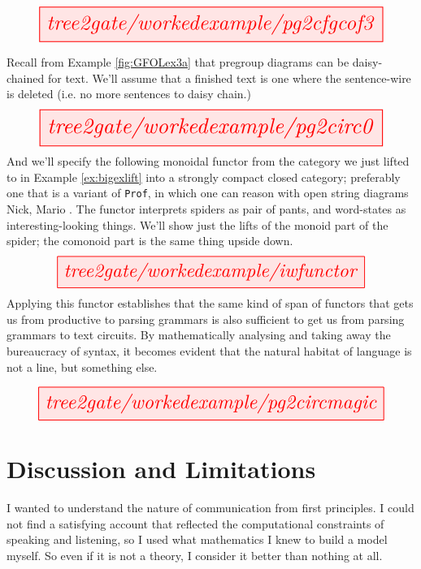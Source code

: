 \begin{myboxB}
\[\resizebox{0.95\textwidth}{!}{\tikzfig{tree2gate/workedexample/pg2cfgcof3}}\]
\end{myboxB}

\begin{myboxR}
\begin{example}
Recall from Example \ref{fig:GFOLex3a} that pregroup diagrams can be daisy-chained for text. We'll assume that a finished text is one where the sentence-wire is deleted (i.e. no more sentences to daisy chain.)
\[\resizebox{0.95\textwidth}{!}{\tikzfig{tree2gate/workedexample/pg2circ0}}\]
And we'll specify the following monoidal functor from the category we just lifted to in Example \ref{ex:bigexlift} into a strongly compact closed category; preferably one that is a variant of \texttt{Prof}, in which one can reason with open string diagrams \bR Nick, Mario \e. The functor interprets spiders as pair of pants, and word-states as interesting-looking things. We'll show just the lifts of the monoid part of the spider; the comonoid part is the same thing upside down.
\[\resizebox{0.85\textwidth}{!}{\tikzfig{tree2gate/workedexample/iwfunctor}}\]
Applying this functor establishes that the same kind of span of functors that gets us from productive to parsing grammars is also sufficient to get us from parsing grammars to text circuits. By mathematically analysing and taking away the bureaucracy of syntax, it becomes evident that the natural habitat of language is not a line, but something else.
\end{example}
\end{myboxR}

\begin{myboxR}
\[\resizebox{0.95\textwidth}{!}{\tikzfig{tree2gate/workedexample/pg2circmagic}}\]
\end{myboxR}

\clearpage
\newpage

\section{Discussion and Limitations}


I wanted to understand the nature of communication from first principles. I could not find a satisfying account that reflected the computational constraints of speaking and listening, so I used what mathematics I knew to build a model myself. So even if it is not a theory, I consider it better than nothing at all.\\

